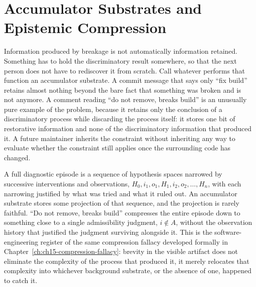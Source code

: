 \section{Accumulator Substrates and Epistemic Compression}

Information produced by breakage is not automatically information retained. Something has to hold the discriminatory result somewhere, so that the next person does not have to rediscover it from scratch. Call whatever performs that function an accumulator substrate. A commit message that says only ``fix build'' retains almost nothing beyond the bare fact that something was broken and is not anymore. A comment reading ``do not remove, breaks build'' is an unusually pure example of the problem, because it retains only the conclusion of a discriminatory process while discarding the process itself: it stores one bit of restorative information and none of the discriminatory information that produced it. A future maintainer inherits the constraint without inheriting any way to evaluate whether the constraint still applies once the surrounding code has changed.

A full diagnostic episode is a sequence of hypothesis spaces narrowed by successive interventions and observations, $H_0, i_1, o_1, H_1, i_2, o_2, \ldots, H_n$, with each narrowing justified by what was tried and what it ruled out. An accumulator substrate stores some projection of that sequence, and the projection is rarely faithful. ``Do not remove, breaks build'' compresses the entire episode down to something close to a single admissibility judgment, $i \notin A$, without the observation history that justified the judgment surviving alongside it. This is the software-engineering register of the same compression fallacy developed formally in Chapter~\ref{ch:ch15-compression-fallacy}: brevity in the visible artifact does not eliminate the complexity of the process that produced it, it merely relocates that complexity into whichever background substrate, or the absence of one, happened to catch it.

